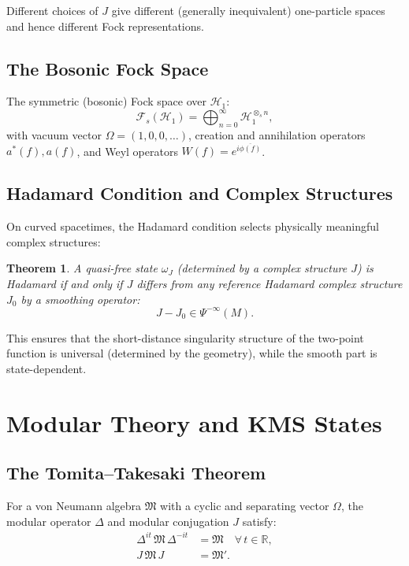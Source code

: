 \documentclass[11pt,a4paper]{article}
\newtheorem{theorem}{Theorem}[section]
\begin{document}
Different choices of $J$ give different (generally inequivalent) one-particle
spaces and hence different Fock representations.

\subsection{The Bosonic Fock Space}

The symmetric (bosonic) Fock space over $\mathcal{H}_1$:
\begin{equation}
  \mathcal{F}_s(\mathcal{H}_1) = \bigoplus_{n=0}^{\infty}
  \mathcal{H}_1^{\otimes_s n},
\end{equation}
with vacuum vector $\Omega = (1, 0, 0, \ldots)$, creation and annihilation
operators $a^*(f), a(f)$, and Weyl operators
$W(f) = e^{i\overline{\phi(f)}}$.

\subsection{Hadamard Condition and Complex Structures}

On curved spacetimes, the Hadamard condition selects physically meaningful
complex structures:

\begin{theorem}
A quasi-free state $\omega_J$ (determined by a complex structure $J$) is
Hadamard if and only if $J$ differs from any reference Hadamard complex
structure $J_0$ by a smoothing operator:
\[
  J - J_0 \in \Psi^{-\infty}(M).
\]
\end{theorem}

This ensures that the short-distance singularity structure of the two-point
function is universal (determined by the geometry), while the smooth part
is state-dependent.

\section{Modular Theory and KMS States}

\subsection{The Tomita--Takesaki Theorem}

For a von Neumann algebra $\mathfrak{M}$ with a cyclic and separating vector
$\Omega$, the modular operator $\Delta$ and modular conjugation $J$ satisfy:
\begin{align}
  \Delta^{it}\, \mathfrak{M}\, \Delta^{-it} &= \mathfrak{M}
  \quad\forall\, t \in \mathbb{R}, \\
  J\, \mathfrak{M}\, J &= \mathfrak{M}'.
\end{align}
\end{document}

